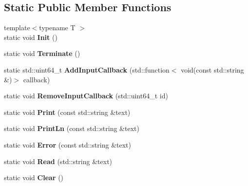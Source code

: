 \subsection*{Static Public Member Functions}
\begin{DoxyCompactItemize}
\item 
\mbox{\label{class_magma_1_1_console_a8c83c9a489ecc745286ef31743fb3903}} 
{\footnotesize template$<$typename T $>$ }\\static void {\bfseries Init} ()
\item 
\mbox{\label{class_magma_1_1_console_a2dda5aacc7dad223904185cfcd31d487}} 
static void {\bfseries Terminate} ()
\item 
\mbox{\label{class_magma_1_1_console_a392e9da4a7de11cfb4874198960318fd}} 
static std\+::uint64\+\_\+t {\bfseries Add\+Input\+Callback} (std\+::function$<$ void(const std\+::string \&)$>$ callback)
\item 
\mbox{\label{class_magma_1_1_console_aa9cc495f5e4fd0b0ad8d61f4bdb12b73}} 
static void {\bfseries Remove\+Input\+Callback} (std\+::uint64\+\_\+t id)
\item 
\mbox{\label{class_magma_1_1_console_a99ef4bf508d7af2c5e03012770ddfcdf}} 
static void {\bfseries Print} (const std\+::string \&text)
\item 
\mbox{\label{class_magma_1_1_console_a6431a046ffcd6d975b052484e24db5e6}} 
static void {\bfseries Print\+Ln} (const std\+::string \&text)
\item 
\mbox{\label{class_magma_1_1_console_ada3fd2fe04bfcfbc6b2be36b22edf2ff}} 
static void {\bfseries Error} (const std\+::string \&text)
\item 
\mbox{\label{class_magma_1_1_console_a2f78f49c7f3ab50a76d68e4b7f345117}} 
static void {\bfseries Read} (std\+::string \&text)
\item 
\mbox{\label{class_magma_1_1_console_aed388a2b46c27040a50eb4f296fc8146}} 
static void {\bfseries Clear} ()
\end{DoxyCompactItemize}
